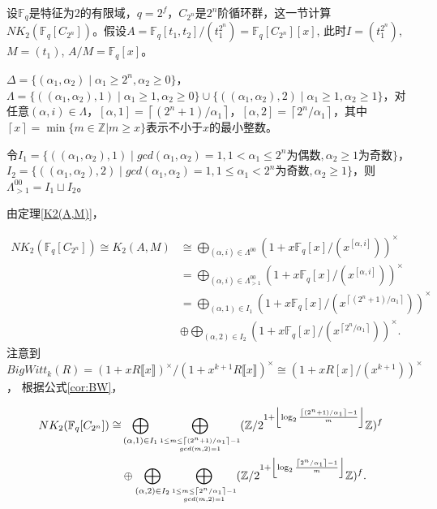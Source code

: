 设$\mathbb{F}_q$是特征为$2$的有限域，$q=2^f$，$C_{2^n}$是$2^n$阶循环群，这一节计算$NK_2(\mathbb{F}_q[C_{2^n}])$。假设$A=\mathbb{F}_q[t_1,t_2]/(t_1^{2^n})=\mathbb{F}_q[C_{2^n}][x]$, 此时$I=(t_1^{2^n})$, $M=(t_1)$, $A/M=\mathbb{F}_q[x]$。

\begin{lemma}
	$\Delta =\{(\alpha_1,\alpha_2)\mid \alpha_1\geq 2^n, \alpha_2 \geq 0\}$，$\Lambda = \{((\alpha_1,\alpha_2),1) \mid \alpha_1\geq 1, \alpha_2\geq 0\}\cup \{((\alpha_1,\alpha_2),2) \mid \alpha_1\geq 1, \alpha_2\geq 1\}$，对任意$(\alpha,i)\in \Lambda$，$[\alpha,1]=\left \lceil (2^n+1)/\alpha_1 \right \rceil$，$[\alpha,2]=\left \lceil 2^n/\alpha_1 \right \rceil$，其中$\left \lceil x \right \rceil=\min \{m\in \mathbb{Z}|m\geq x\}$表示不小于$x$的最小整数。
\end{lemma}

\begin{lemma}
令$I_1 =\{((\alpha_1,\alpha_2),1)\mid gcd(\alpha_1,\alpha_2)=1, 1< \alpha_1\leq 2^n\text{为偶数}, \alpha_2\geq 1\text{为奇数}\}$，$I_2=\{((\alpha_1,\alpha_2),2)\mid gcd(\alpha_1,\alpha_2)=1, 1\leq \alpha_1<2^n\text{为奇数}, \alpha_2\geq 1\}$，则$\Lambda^{00}_{>1}=I_1\sqcup I_2$。
\end{lemma}
由定理\ref{K2(A,M)}，

\begin{align*}
NK_2(\mathbb{F}_q[C_{2^n}])\cong K_2(A,M) &\cong \bigoplus_{(\alpha,i)\in\Lambda^{00}}(1+x\mathbb{F}_q[x]/(x^{[\alpha,i]}))^{\times}\\
& = \bigoplus_{(\alpha,i)\in \Lambda^{00}_{>1}}(1+x\mathbb{F}_q[x]/(x^{[\alpha,i]}))^{\times}\\
& = \bigoplus_{(\alpha,1)\in I_1}(1+x\mathbb{F}_q[x]/(x^{\left \lceil (2^n+1)/\alpha_1 \right \rceil}))^{\times} \\
& \oplus \bigoplus_{(\alpha,2)\in I_2}(1+x\mathbb{F}_q[x]/(x^{\left \lceil 2^n/\alpha_1 \right \rceil}))^{\times}.
\end{align*}
注意到$BigWitt_{k}(R)=(1+x R\llbracket x\rrbracket )^{\times}/(1+x^{k+1} R\llbracket x\rrbracket )^{\times} \cong (1+x R[x]/(x^{k+1}))^{\times}$，
根据公式\ref{cor:BW}，

\begin{align*}
NK_2(\mathbb{F}_q[C_{2^n}])\cong & \bigoplus_{(\alpha,1)\in I_1}\bigoplus_{\scriptsize\substack{1\leq m\leq \left \lceil (2^n+1)/\alpha_1 \right \rceil-1 \\ gcd(m,2)=1}}(\mathbb{Z}/2^{1+ \left \lfloor\log_2 \frac{\left \lceil (2^n+1)/\alpha_1 \right \rceil-1}{m}  \right \rfloor}\mathbb{Z})^f \\
& \oplus \bigoplus_{(\alpha,2)\in I_2}\bigoplus_{\scriptsize\substack{ 1 \leq m\leq \left \lceil 2^n/\alpha_1 \right \rceil-1 \\ gcd(m,2)=1}}(\mathbb{Z}/2^{1+ \left \lfloor\log_2 \frac{\left \lceil 2^n/\alpha_1 \right \rceil-1}{m}  \right \rfloor}\mathbb{Z})^f.
\end{align*}

